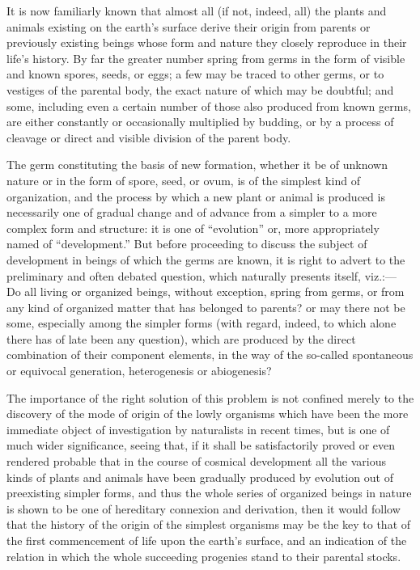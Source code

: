 \documentclass[a4paper, 11pt, oneside, english]{article}
\begin{document}
It is now familiarly known that almost all (if not, indeed, all) the plants and animals existing on the earth's surface derive their origin from parents or previously existing beings whose form and nature they closely reproduce in their life's history. By far the greater number spring from germs in the form of visible and known spores, seeds, or eggs; a few may be traced to other germs, or to vestiges of the parental body, the exact nature of which may be doubtful; and some, including even a certain number of those also produced from known germs, are either constantly or occasionally multiplied by budding, or by a process of cleavage or direct and visible division of the parent body.

The germ constituting the basis of new formation, whether it be of unknown nature or in the form of spore, seed, or ovum, is of the simplest kind of organization, and the process by which a new plant or animal is produced is necessarily one of gradual change and of advance from a simpler to a more complex form and structure: it is one of ``evolution'' or, more appropriately named of ``development.'' But before proceeding to discuss the subject of development in beings of which the germs are known, it is right to advert to the preliminary and often debated question, which naturally presents itself, viz.:--- Do all living or organized beings, without exception, spring from germs, or from any kind of organized matter that has belonged to parents? or may there not be some, especially among the simpler forms (with regard, indeed, to which alone there has of late been any question), which are produced by the direct combination of their component elements, in the way of the so-called spontaneous or equivocal generation, heterogenesis or abiogenesis?

The importance of the right solution of this problem is not confined merely to the discovery of the mode of origin of the lowly organisms which have been the more immediate object of investigation by naturalists in recent times, but is one of much wider significance, seeing that, if it shall be satisfactorily proved or even rendered probable that in the course of cosmical development all the various kinds of plants and animals have been gradually produced by evolution out of preexisting simpler forms, and thus the whole series of organized beings in nature is shown to be one of hereditary connexion and derivation, then it would follow that the history of the origin of the simplest organisms may be the key to that of the first commencement of life upon the earth's surface, and an indication of the relation in which the whole succeeding progenies stand to their parental stocks.
\end{document}
